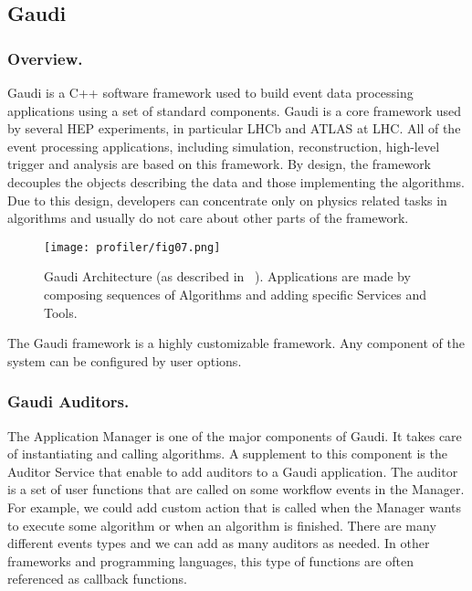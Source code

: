 \subsection{Gaudi}

\subsubsection{Overview.}

Gaudi is a C++ software framework used to build event data processing
applications using a set of standard components. Gaudi is a core framework used
by several HEP experiments, in particular LHCb and ATLAS at LHC. All of the
event processing applications, including simulation, reconstruction, high-level
trigger and analysis are based on this framework. By design, the framework
decouples the objects  describing the data and those implementing the
algorithms. Due to this design,  developers can concentrate only on  physics
related tasks in algorithms and usually do not care about other parts of the
framework.

\begin{figure}[H]
\begin{minipage}{\textwidth}
\texttt{[image: profiler/fig07.png]}
\caption{\label{fig07}Gaudi Architecture (as described in ~\cite{gaudi}).
Applications are made by composing sequences of Algorithms and adding specific
Services and Tools.}
\end{minipage}
\end{figure}

The Gaudi framework is a highly customizable framework. Any component of the
system can be configured by user options.

\subsubsection{Gaudi Auditors.}

The Application Manager is one of the major components of Gaudi. It takes care
of instantiating and calling algorithms. A supplement to this component  is the
Auditor Service that enable to add auditors to a Gaudi application. The auditor
is a set of user functions that are called on some workflow events in the
Manager. For example, we could add custom action that is called when the
Manager wants to execute some algorithm or when an algorithm is finished.
There are many different events types and we can add as many auditors as
needed. In other frameworks and programming languages, this type of functions
are often referenced as callback functions.

